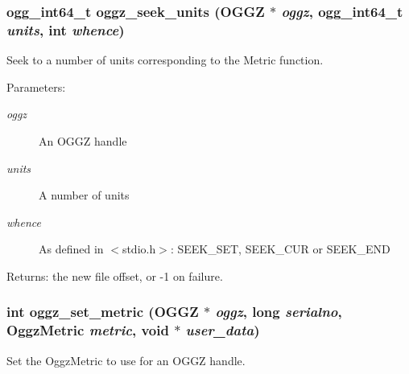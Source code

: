 \subsubsection{\setlength{\rightskip}{0pt plus 5cm}ogg\_\-int64\_\-t oggz\_\-seek\_\-units ({\bf OGGZ} $\ast$ {\em oggz}, ogg\_\-int64\_\-t {\em units}, int {\em whence})}\label{group__seeking__group_a3}


Seek to a number of units corresponding to the Metric function. 

\begin{Desc}
\item[Parameters:]
\begin{description}
\item[{\em oggz}]An OGGZ handle \item[{\em units}]A number of units \item[{\em whence}]As defined in $<$stdio.h$>$: SEEK\_\-SET, SEEK\_\-CUR or SEEK\_\-END \end{description}
\end{Desc}
\begin{Desc}
\item[Returns:]the new file offset, or -1 on failure. \end{Desc}
\subsubsection{\setlength{\rightskip}{0pt plus 5cm}int oggz\_\-set\_\-metric ({\bf OGGZ} $\ast$ {\em oggz}, long {\em serialno}, {\bf Oggz\-Metric} {\em metric}, void $\ast$ {\em user\_\-data})}\label{group__seeking__group_a2}


Set the Oggz\-Metric to use for an OGGZ handle. 

